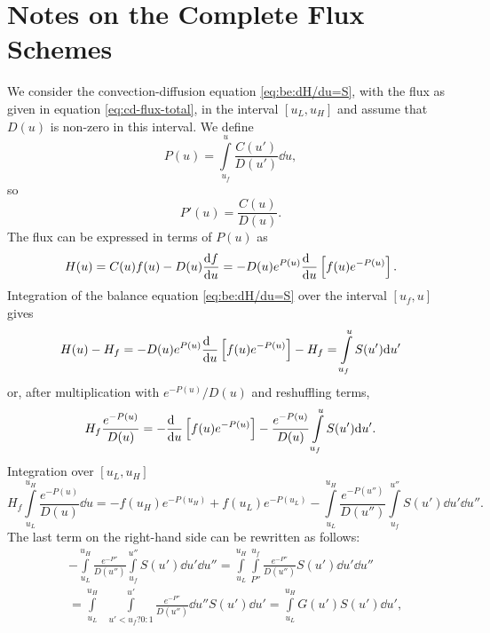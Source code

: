 \documentclass{book}
\begin{document}
\chapter{Notes on the Complete Flux Schemes}
\label{ch:cf-scheme}

We consider the convection-diffusion equation \eqref{eq:be:dH/du=S}, with the flux as
given in equation \eqref{eq:cd-flux-total}, in the interval $[u_L,u_H]$ and assume
that $D(u)$ is non-zero in this interval. We define
\begin{equation}
	P(u) = \int\limits_{u_f}^u \frac{C(u')}{D(u')}\dd{u},
\end{equation}
so
\begin{equation}
	P'(u) = \frac{C(u)}{D(u)}.
\end{equation}
The flux can be expressed in terms of $P(u)$ as
\begin{equation}
	H(u)
	= C(u)f(u)-D(u)\DERIV{f}{u}
	=-D(u)e^{P(u)}\DERIV{}{u}\left[f(u)e^{-P(u)}\right].
\end{equation}
Integration of the balance equation \eqref{eq:be:dH/du=S} over the interval $[u_f,u]$ gives
\begin{equation}
	H(u) - H_f
	= -D(u)e^{P(u)}\DERIV{}{u}\left[f(u)e^{-P(u)}\right] - H_f
	= \int\limits_{u_f}^u S(u')\dd{u'}
\end{equation}
or, after multiplication with $e^{-P(u)}/D(u)$ and reshuffling terms,
\begin{equation}
	H_f \frac{e^{-P(u)}}{D(u)}
	=
	- \DERIV{}{u}\left[f(u)e^{-P(u)}\right]
	- \frac{e^{-P(u)}}{D(u)}\int\limits_{u_f}^u S(u')\dd{u'}.
\end{equation}
Integration over $[u_L,u_H]$
\begin{equation}
	H_f \int\limits_{u_L}^{u_H} \frac{e^{-P(u)}}{D(u)} \dd{u}
	=
	- f(u_H)e^{-P(u_H)}
	+ f(u_L)e^{-P(u_L)}
	- \int\limits_{u_L}^{u_H} \frac{e^{-P(u'')}}{D(u'')}\int\limits_{u_f}^{u''} S(u')\dd{u'} \dd{u''}.
\end{equation}
The last term on the right-hand side can be rewritten as follows:
\begin{align}
	& - \int\limits_{u_L}^{u_H} \frac{e^{-P''}}{D(u'')}\int\limits_{u_f}^{u''} S(u')\dd{u'} \dd{u''}
	  = \int\limits_{u_L}^{u_H} \int\limits_{P''}^{u_f} \frac{e^{-P''}}{D(u'')} S(u')\dd{u'} \dd{u''}
	\nonumber \\
	& = \int\limits_{u_L}^{u_H} \;\;\int\limits_{u'<u_f ? 0 : 1}^{u'} \frac{e^{-P''}}{D(u'')} \dd{u''} S(u') \dd{u'}
	  = \int\limits_{u_L}^{u_H} G(u')S(u') \dd{u'},
\end{align}
\end{document}

